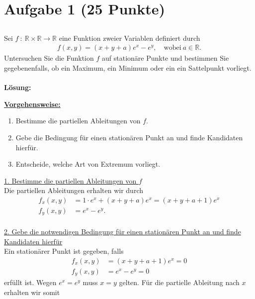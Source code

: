 \vspace{1cm}
\renewcommand{\labelenumi}{\theenumi.}
\section*{Aufgabe 1 (25 Punkte)}
\vspace{0.4cm}
\subsection*{}
Sei $ f \ : \ \mathbb{R} \times \mathbb{R} \to \mathbb{R} $ eine Funktion zweier Variablen definiert durch
\begin{align*}
f(x,y) = (x+y+a) e^x - e^y, \quad \textrm{wobei} \ a \in \mathbb{R}.
\end{align*}
Untersuchen Sie die Funktion $ f $ auf stationäre Punkte und bestimmen Sie gegebenenfalls, ob ein Maximum, ein Minimum oder ein ein Sattelpunkt vorliegt.
\\
\\
\textbf{Lösung:}
\begin{mdframed}
\underline{\textbf{Vorgehensweise:}}
\renewcommand{\labelenumi}{\theenumi.}
\begin{enumerate}
\item 
Bestimme die partiellen Ableitungen von $ f $.
\item  
Gebe die Bedingung für einen stationären Punkt an und finde Kandidaten hierfür.
\item Entscheide, welche Art von Extremum vorliegt.
\end{enumerate}
\end{mdframed}
\underline{1. Bestimme die partiellen Ableitungen von $ f $}\\
Die partiellen Ableitungen erhalten wir durch
\begin{align*}
f_x(x,y)
&=
 1 \cdot  e^x + (x+y+a)e^x  = (x+y+a+1)e^x\\
f_y(x,y) 
&= 
e^x -e^y.
\end{align*}
\ \\
\underline{2. Gebe die notwendigen Bedingung für einen stationären Punkt an und finde Kandidaten hierfür}\\
Ein stationärer Punkt ist gegeben, falls
\begin{align*}
f_x(x,y) &= (x+y+a+1) e^x  =0\\
f_y(x,y) &= e^x - e^y =  0
\end{align*}
erfüllt ist.
Wegen $ e^x = e^y  $ muss $ x = y  $ gelten. Für die partielle Ableitung nach $ x $ erhalten wir somit

